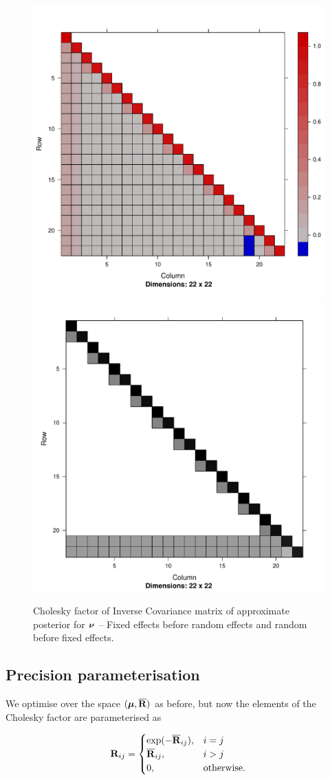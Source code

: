 \begin{figure}[h!]
	\includegraphics[width=0.45 \textwidth]{mX_mZ_cholesky.pdf}
	\includegraphics[width=0.45 \textwidth]{mZ_mX_cholesky.pdf}
	\caption{Cholesky factor of Inverse Covariance matrix of approximate posterior for ${\boldsymbol \nu}$ -- Fixed effects 
						before random effects and random before fixed effects.}
	\label{fig:cholfixedrandom}
\end{figure}

\subsection{Precision parameterisation}

We optimise over the space $({\boldsymbol \mu}, \overline{{\bf R}})$ as before, but now the elements of the Cholesky factor
are parameterised as
		
\begin{equation*}
\label{eq:cholesky_element_precision_param}
	{\bf R}_{ij} =
	\begin{cases}
		\exp(-\overline{{\bf R}}_{ij}), & i = j             \\
		\overline{{\bf R}}_{ij},        & i > j             \\
		0,                          & \text{otherwise}.
	\end{cases}
\end{equation*}
	
